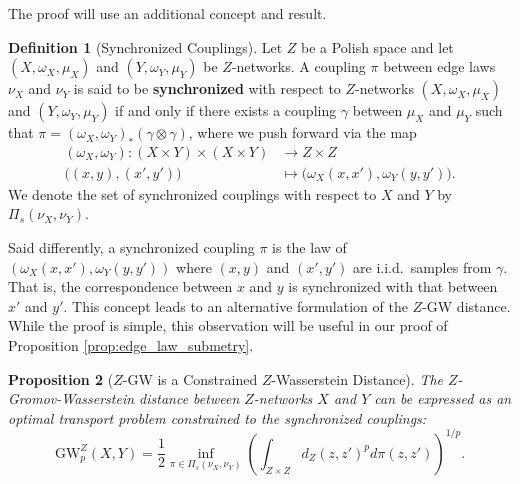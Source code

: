 \documentclass{article}
\newtheorem{proposition}{Proposition}[section]
\theoremstyle{definition}
\newtheorem{definition}[proposition]{Definition}
\newcommand{\dgwz}{\mathrm{GW}_p^Z}
\begin{document}
The proof will use an additional concept and result.

\begin{definition}[Synchronized Couplings]
    \label{def:synchronizable_coupling} Let $Z$ be a Polish space and let $(X,\omega_X,\mu_X)$ and $ (Y,\omega_Y,\mu_Y)$ be $Z$-networks. A coupling $\pi$ between edge laws $\nu_X$ and $\nu_Y$ is said to be \textbf{synchronized} with respect to $Z$-networks $(X,\omega_X,\mu_X)$ and $(Y,\omega_Y,\mu_Y)$ if and only if there exists a coupling $\gamma$ between $\mu_X$ and $\mu_Y$ such that $\pi = (\omega_X, \omega_Y)_* (\gamma \otimes \gamma)$, where we push forward via the map
    \begin{align*}
    (\omega_X,\omega_Y):(X \times Y) \times (X \times Y) &\to Z \times Z \\
    \big((x,y),(x',y')\big) &\mapsto \big(\omega_X(x,x'),\omega_Y(y,y')\big).
    \end{align*}
    We denote the set of synchronized couplings with respect to $X$ and $Y$ by $\Pi_{s}(\nu_X, \nu_Y)$.
\end{definition}


Said differently, a synchronized coupling $\pi$ is the law of $(\omega_X(x, x'), \omega_Y(y, y'))$ where $(x, y)$ and $(x', y')$ are i.i.d.~samples from $\gamma$. That is, the correspondence between $x$ and $y$ is synchronized with that between $x'$ and $y'$. This concept leads to an alternative formulation of the $Z$-GW distance. While the proof is simple, this observation will be useful in our proof of Proposition \ref{prop:edge_law_submetry}.

\begin{proposition}[$Z$-GW is a Constrained $Z$-Wasserstein Distance]\label{prop:zgw_is_constrained_W} The $Z$-Gromov-Wasserstein distance between $Z$-networks $X$ and $Y$ can be expressed as an optimal transport problem constrained to the synchronized couplings:
    \begin{equation}
        \dgwz(X, Y) =  
        \frac{1}{2}\inf_{\pi \in \Pi_{s}(\nu_X,\nu_Y)} \left(\int_{Z \times Z} d_Z(z, z')^p d\pi(z, z')\right)^{1/p}.
    \end{equation}
\end{proposition}
\end{document}
